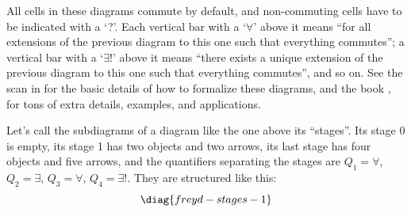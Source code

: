 \documentclass[oneside,12pt]{article}
\begin{document}
All cells in these diagrams commute by default, and non-commuting
cells have to be indicated with a `?'. Each vertical bar with a `$∀$'
above it means ``for all extensions of the previous diagram to this
one such that everything commutes''; a vertical bar with a `$∃!$'
above it means ``there exists a unique extension of the previous
diagram to this one such that everything commutes'', and so on. See
the scan in \cite{Freyd76} for the basic details of how to formalize
these diagrams, and the book \cite[p.28 onwards]{FreydScedrov}, for
tons of extra details, examples, and applications.

Let's call the subdiagrams of a diagram like the one above its
``stages''. Its stage 0 is empty, its stage 1 has two objects and two
arrows, its last stage has four objects and five arrows, and the
quantifiers separating the stages are $Q_1=∀$, $Q_2=∃$, $Q_3=∀$,
$Q_4=∃!$. They are structured like this:
%
\pu
$$
  \diag{freyd-stages-1}
$$
\end{document}
